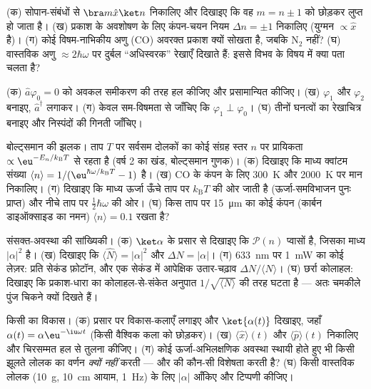 \begin{exercise}[$\star$]\label{exo:b3:harmonic-oscillator:4}
(क) सोपान-संबंधों से $\bra m\hat x\ket n$ निकालिए और
दिखाइए कि वह $m = n \pm 1$ को छोड़कर लुप्त हो जाता है। (ख) प्रकाश के
अवशोषण के लिए कंपन-चयन नियम $\Delta n = \pm1$ निकालिए (युग्मन
$\propto\hat x$ है)। (ग) कोई विषम-नाभिकीय अणु (CO)
अवरक्त प्रकाश क्यों सोखता है, जबकि N$_2$ नहीं? (घ) वास्तविक अणु
$\approx 2\hbar\omega$ पर दुर्बल ``अधिस्वरक'' रेखाएँ दिखाते हैं: इससे
विभव के विषय में क्या पता चलता है?
\end{exercise}

\begin{exercise}[$\star\star$]\label{exo:b3:harmonic-oscillator:5}
(क) $\hat a\varphi_0 = 0$ को अवकल समीकरण की तरह हल कीजिए और
प्रसामान्यित कीजिए। (ख) $\varphi_1$ और $\varphi_2$ बनाइए,
$\hat a^\dagger$ लगाकर। (ग) केवल सम-विषमता से जाँचिए कि $\varphi_1 \perp \varphi_0$।
(घ) तीनों घनत्वों का रेखाचित्र बनाइए और निस्पंदों की गिनती जाँचिए।
\end{exercise}

\begin{exercise}[$\star\star$]\label{exo:b3:harmonic-oscillator:6}
बोल्ट्समान की झलक। ताप $T$ पर सर्वसम दोलकों का कोई संग्रह स्तर
$n$ पर प्रायिकता $\propto
\eu^{-E_n/k_{\text{B}}T}$ से रहता है (वर्ष 2 का खंड, बोल्ट्समान गुणक)। (क)
दिखाइए कि माध्य क्वांटम संख्या $\langle n\rangle =
1/(\eu^{\hbar\omega/k_{\text{B}}T} - 1)$ है। (ख) CO के
कंपन के लिए \qty{300}{K} और \qty{2000}{K} पर मान निकालिए। (ग) दिखाइए कि माध्य
ऊर्जा ऊँचे ताप पर $k_{\text{B}}T$ की ओर जाती है (ऊर्जा-समविभाजन
पुनः प्राप्त) और नीचे ताप पर $\tfrac12\hbar\omega$ की ओर। (घ) किस
ताप पर \qty{15}{\micro m} का कोई कंपन (कार्बन डाइऑक्साइड का
नमन) $\langle n\rangle = 0.1$ रखता है?
\end{exercise}

\begin{exercise}[$\star\star$]\label{exo:b3:harmonic-oscillator:7}
संसक्त-अवस्था की सांख्यिकी। (क) $\ket\alpha$ के प्रसार से
दिखाइए कि $\mathcal P(n)$ प्वासों है, जिसका माध्य $|\alpha|^2$ है। (ख) दिखाइए कि
$\langle\hat N\rangle = |\alpha|^2$ और $\Delta N = |\alpha|$। (ग)
\qty{633}{nm} पर \qty{1}{mW} का कोई लेज़र: प्रति सेकंड फ़ोटॉन, और एक
सेकंड में आपेक्षिक उतार-चढ़ाव $\Delta N/\langle N\rangle$। (घ)
छर्रा कोलाहल: दिखाइए कि प्रकाश-धारा का कोलाहल-से-संकेत अनुपात
$1/\sqrt{\langle N\rangle}$ की तरह घटता है --- अतः चमकीले पुंज चिकने क्यों दिखते हैं।
\end{exercise}

\begin{exercise}[$\star\star$]\label{exo:b3:harmonic-oscillator:8}
किसी  का विकास। (क) प्रसार पर विकास-कलाएँ लगाइए और
$\ket{\alpha(t)}$ दिखाइए, जहाँ $\alpha(t) =
\alpha\eu^{-\iu\omega t}$ (किसी वैश्विक कला को छोड़कर)। (ख)
$\langle\hat x\rangle(t)$ और $\langle\hat p\rangle(t)$ निकालिए और
चिरसम्मत हल से तुलना कीजिए। (ग) कोई ऊर्जा-अभिलक्षणिक अवस्था स्थायी
होते हुए भी किसी झूलते लोलक का वर्णन \emph{क्यों नहीं} करती ---
और  की कौन-सी विशेषता करती है? (घ) किसी वास्तविक लोलक
(\qty{10}{g}, \qty{10}{cm} आयाम, \qty{1}{Hz}) के लिए $|\alpha|$ आँकिए
और टिप्पणी कीजिए।
\end{exercise}


